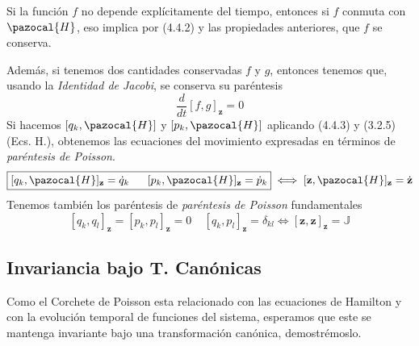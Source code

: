Si la función $f$ no depende explícitamente del tiempo, entonces si $f$ conmuta con $\pazocal{H}$, eso implica por (4.4.2) y las propiedades anteriores, que $f$ se conserva.

Además, si tenemos dos cantidades conservadas $f$ y $g$, entonces tenemos que, usando la \textit{Identidad de Jacobi}, se conserva su paréntesis
\begin{equation} \label{4.4.5}
    \frac{d}{dt}[f,g]_\mathbf{z}=0
\end{equation} 
Si hacemos $[q_k,\pazocal{H}]$ y $[p_k,\pazocal{H}]$ aplicando (4.4.3) y (3.2.5) (Ecs. H.), obtenemos las ecuaciones del movimiento expresadas en términos de \textit{paréntesis de Poisson}.
\begin{equation} \label{4.4.6}
    \boxed{[q_k,\pazocal{H}]_\mathbf{z} = \dot{q}_k \ \ \ \ \ [p_k,\pazocal{H}]_\mathbf{z}=\dot{p}_k} \iff [\mathbf{z},\pazocal{H}]_\mathbf{z} = \dot{\mathbf{z}}
\end{equation} 
Tenemos también los paréntesis de \textit{paréntesis de Poisson} fundamentales
\begin{equation} \label{4.4.7}
    [q_k,q_l]_\mathbf{z}=[p_k,p_l]_\mathbf{z}=0 \ \ \ \ \ [q_k,p_l]_\mathbf{z}=\delta_{kl} \iff [\mathbf{z},\mathbf{z}]_\mathbf{z} = \mathbb{J}
\end{equation} 

\subsection{Invariancia bajo T. Canónicas}
Como el Corchete de Poisson esta relacionado con las ecuaciones de Hamilton y con la evolución temporal de funciones del sistema, esperamos que este se mantenga invariante bajo una transformación canónica, demostrémoslo.

